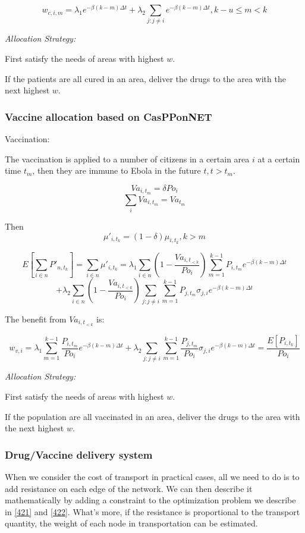 \documentclass[11pt]{article}
\begin{document}
$$w_{c,i,m} = \lambda_1 e^{-\beta(k-m)\Delta t} + \lambda_2 \sum_{j:j\neq i} e^{-\beta(k-m) \Delta t}, k-u\leq m < k$$

\label{421}

\emph{Allocation Strategy:}

First satisfy the needs of areas with highest $w$.

If the patients are all cured in an area, deliver the drugs to the area with the next highest $w$.

\subsubsection{Vaccine allocation based on CasPPonNET}


Vaccination:

The vaccination is applied to a number of citizens in a certain area $i$ at a certain time $t_m$, then they are immune to Ebola in the future $t,t>t_m$. 

$$Va_{i,t_m} = \delta Po_i $$
$$\sum_i Va_{i,t_m} = Va_{t_m} $$
 

Then 
$$\mu'_{i,t_k} =(1 - \delta) \mu_{i,t_k} , k > m $$ 


$$
E[\sum_{i \in n} {P'_{n,t_k}}] = \sum_{i \in n} \mu'_{i,t_k} = \lambda_1 \sum_{i \in n} \left( 1 - \frac{Va_{i,t_{ < k}}}{Po_i} \right) \sum_{m = 1}^{ k-1} P_{i,t_m} e^{-\beta(k-m)\Delta t} $$
$$ + \lambda_2 \sum_{i \in n}\left( 1 - \frac{Va_{i,t_{< k}}}{Po_i}\right) \sum_{j:j\neq i} \sum_{m = 1}^{ k-1} P_{j,t_m} \sigma_{j,i} e^{-\beta(k-m)\Delta t}
$$

The benefit from $Va_{i,t_{ < k}}$ is:

$$
w_{v,i} = \lambda_1 \sum_{m = 1}^{ k-1} \frac{P_{i,t_m}}{Po_{i}} e^{-\beta(k-m)\Delta t} + \lambda_2 \sum_{j:j\neq i} \sum_{m = 1}^{ k-1} \frac{P_{j,t_m}}{Po_{i}} \sigma_{j,i} e^{-\beta(k-m)\Delta t} = \frac{E[P_{i,t_k}]}{Po_{i}}
$$
\label{422}


\emph{Allocation Strategy:}

First satisfy the needs of areas with highest $w$.

If the population are all vaccinated in an area, deliver the drugs to the area with the next highest $w$.

\subsubsection{Drug/Vaccine delivery system}

When we consider the cost of transport in practical cases, all we need to do is to add resistance on each edge of the network. We can then describe it mathematically by adding a constraint to the optimization problem we describe in \ref{421} and \ref{422}. What's more, if the resistance is proportional to the transport quantity, the weight of each node in transportation can be estimated.
\end{document}
